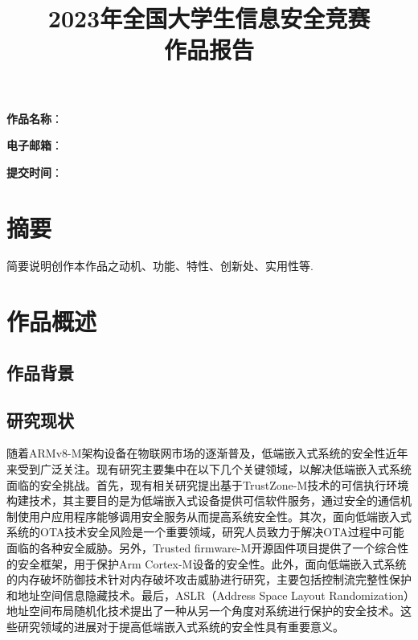 \documentclass[12pt,a4paper]{ctexart}
\date{}
\title{\Huge\textbf{2023年全国大学生信息安全竞赛\\作品报告}}
\begin{document}
\maketitle
\vspace{6cm}
{
    \Large\textbf{作品名称}：\textbf{\underline{}}

    \textbf{\underline{}}

    \textbf{电子邮箱}：\underline{}

    \textbf{提交时间}：\underline{\makebox[10cm]{\textbf{\today}}}
}
\thispagestyle{empty}
\clearpage

\thispagestyle{empty}
\clearpage
\tableofcontents
\thispagestyle{empty}
\clearpage
\setcounter{page}{1}
\section*{摘要}
\thispagestyle{empty}
简要说明创作本作品之动机、功能、特性、创新处、实用性等.
\clearpage
\section{作品概述}
\subsection{作品背景}

\subsection{研究现状}
\par 随着ARMv8-M架构设备在物联网市场的逐渐普及，低端嵌入式系统的安全性近年来受到广泛关注。现有研究主要集中在以下几个关键领域，以解决低端嵌入式系统面临的安全挑战。首先，现有相关研究提出基于TrustZone-M技术的可信执行环境构建技术，其主要目的是为低端嵌入式设备提供可信软件服务，通过安全的通信机制使用户应用程序能够调用安全服务从而提高系统安全性。其次，面向低端嵌入式系统的OTA技术安全风险是一个重要领域，研究人员致力于解决OTA过程中可能面临的各种安全威胁。另外，Trusted firmware-M开源固件项目提供了一个综合性的安全框架，用于保护Arm Cortex-M设备的安全性。此外，面向低端嵌入式系统的内存破坏防御技术针对内存破坏攻击威胁进行研究，主要包括控制流完整性保护和地址空间信息隐藏技术。最后，ASLR（Address Space Layout Randomization）地址空间布局随机化技术提出了一种从另一个角度对系统进行保护的安全技术。这些研究领域的进展对于提高低端嵌入式系统的安全性具有重要意义。
\end{document}
